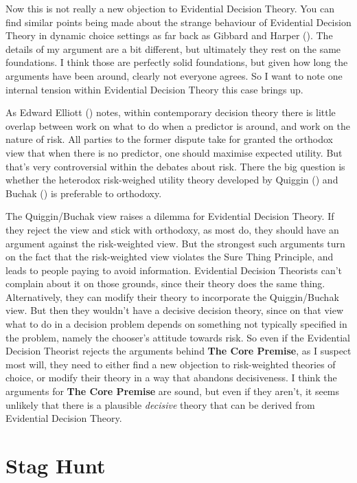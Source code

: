 \documentclass[
  11pt,
  letterpaper,
  DIV=11,
  numbers=noendperiod,
  twoside]{scrartcl}
\begin{document}
Now this is not really a new objection to Evidential Decision Theory.
You can find similar points being made about the strange behaviour of
Evidential Decision Theory in dynamic choice settings as far back as
Gibbard and Harper (). The details
of my argument are a bit different, but ultimately they rest on the same
foundations. I think those are perfectly solid foundations, but given
how long the arguments have been around, clearly not everyone agrees. So
I want to note one internal tension within Evidential Decision Theory
this case brings up.

As Edward Elliott () notes, within
contemporary decision theory there is little overlap between work on
what to do when a predictor is around, and work on the nature of risk.
All parties to the former dispute take for granted the orthodox view
that when there is no predictor, one should maximise expected utility.
But that's very controversial within the debates about risk. There the
big question is whether the heterodox risk-weighed utility theory
developed by Quiggin () and Buchak
() is preferable to orthodoxy.

The Quiggin/Buchak view raises a dilemma for Evidential Decision Theory.
If they reject the view and stick with orthodoxy, as most do, they
should have an argument against the risk-weighted view. But the
strongest such arguments turn on the fact that the risk-weighted view
violates the Sure Thing Principle, and leads to people paying to avoid
information. Evidential Decision Theorists can't complain about it on
those grounds, since their theory does the same thing. Alternatively,
they can modify their theory to incorporate the Quiggin/Buchak view. But
then they wouldn't have a decisive decision theory, since on that view
what to do in a decision problem depends on something not typically
specified in the problem, namely the chooser's attitude towards risk. So
even if the Evidential Decision Theorist rejects the arguments behind
\textbf{The Core Premise}, as I suspect most will, they need to either
find a new objection to risk-weighted theories of choice, or modify
their theory in a way that abandons decisiveness. I think the arguments
for \textbf{The Core Premise} are sound, but even if they aren't, it
seems unlikely that there is a plausible \emph{decisive} theory that can
be derived from Evidential Decision Theory.

\section{Stag Hunt}\label{stag-hunt}
\end{document}
